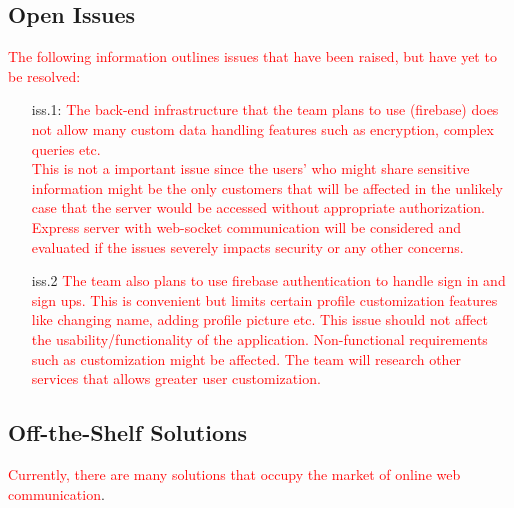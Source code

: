 \documentclass[12pt, titlepage]{article}
\begin{document}
    	\subsection{Open Issues}
        \textcolor{red}{The following information outlines issues that have been raised, but have yet to be resolved:\\}
        \begin{enumerate}
            \item [iss.1:] \textcolor{red}{The back-end infrastructure that the team plans to use (firebase) does not allow many custom data handling features such as encryption, complex queries
                            etc.\\ This is not a important issue since the
                            users' who might share sensitive information might be the only customers that will be affected
                            in the unlikely case that the server would be accessed without appropriate authorization. 
                            Express server with web-socket communication will be considered and evaluated if the issues severely impacts security or any other concerns.}

            \item [iss.2] \textcolor{red}{The team also plans to use firebase authentication to handle sign in and sign ups.
                            This is convenient but limits certain profile customization features
                            like changing name, adding profile picture etc.
                            This issue should not affect the usability/functionality of the application.
                            Non-functional requirements such as customization might be affected.
                            The team will research other services that allows greater user customization.}  
        \end{enumerate}

    	\subsection{Off-the-Shelf Solutions}
		\textcolor{red}{Currently, there are many solutions that occupy the market of online web communication}.	
	    	
\end{document}
